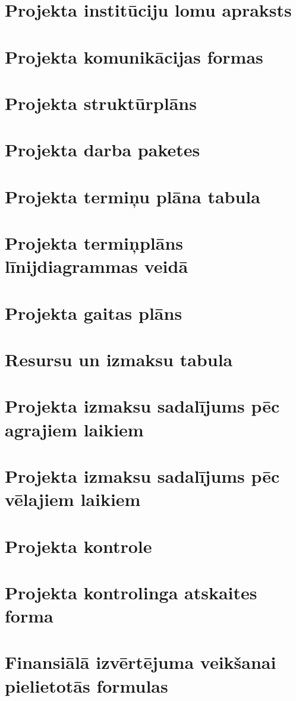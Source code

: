 \section{Projekta institūciju lomu apraksts}
\label{app:Projekta_instituciju_apraksts}
    \clearpage
\section{Projekta komunikācijas formas}
\label{app:Projekta_komunikacijas_formas}
    \clearpage
\section{Projekta struktūrplāns}
\label{app:Projekta_strukturplans}
    \clearpage
\section{Projekta darba paketes}
\label{app:Projekta_darba_paketes}
    \clearpage
\section{Projekta termiņu plāna tabula}
\label{app:Projekta_terminu_plans}
    \clearpage
\section{Projekta termiņplāns līnijdiagrammas veidā}
\label{app:Projekta_linijdiagrammas}
    \clearpage
\section{Projekta gaitas plāns}
\label{app:Projekta_gaitas_plans}
    \clearpage
\section{Resursu un izmaksu tabula}
\label{app:Projekta_resursu_izmaksu_tabula}
    \clearpage
\section{Projekta izmaksu sadalījums pēc agrajiem laikiem}
\label{app:Projekta_izmaksu_salidzinajums_agrais}
    \clearpage
\section{Projekta izmaksu sadalījums pēc vēlajiem laikiem}
\label{app:Projekta_izmaksu_salidzinajums_velais}
    \clearpage
\section{Projekta kontrole}
\label{app:Projekta_konrole}
    \clearpage
\section{Projekta kontrolinga atskaites forma}
\label{app:Projekta_atskaitas_forma}
    \clearpage
\section{Finansiālā izvērtējuma veikšanai pielietotās formulas }
\label{app:Projekta_formulas}
    \clearpage

